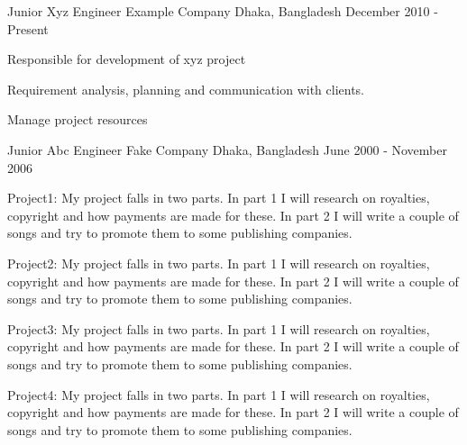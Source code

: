 \begin{cventries}

\cventry
    {Junior Xyz Engineer}
    {Example Company}
    {Dhaka, Bangladesh}
    {December 2010 - Present}
    {
      \begin{cvitems}[Responsibilities:]
        \item {Responsible for development of xyz project}
        \vspace{1mm}
        \item {Requirement analysis, planning and communication with clients.}
        \vspace{1mm}
        \item {Manage project resources}
      \end{cvitems}
    }

\cventry
    {Junior Abc Engineer}
    {Fake Company}
    {Dhaka, Bangladesh}
    {June 2000 - November 2006}
    {
      \begin{cvitems}[Projects:]
        \vspace{1mm}
        \item {Project1: My project falls in two parts. In part 1 I will research on royalties, copyright and how payments are made for these. In part 2 I will write a couple of songs and try to promote them to some publishing companies.}
        \vspace{1mm}
        \item {Project2: My project falls in two parts. In part 1 I will research on royalties, copyright and how payments are made for these. In part 2 I will write a couple of songs and try to promote them to some publishing companies.}
        \vspace{1mm}
        \item {Project3: My project falls in two parts. In part 1 I will research on royalties, copyright and how payments are made for these. In part 2 I will write a couple of songs and try to promote them to some publishing companies.}
        \vspace{1mm}
        \item {Project4: My project falls in two parts. In part 1 I will research on royalties, copyright and how payments are made for these. In part 2 I will write a couple of songs and try to promote them to some publishing companies.}
      \end{cvitems}
    }
\end{cventries}

